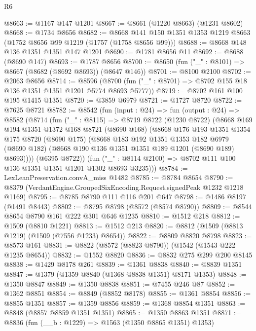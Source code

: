 \begin{lexlean}{R6}
\begin{coremodule}
@8663 := @1167 @147 @1201
@8667 := @8661 (@1220 @8663) (@1231 @8602)
@8668 := @1734 @8656
@8682 := @8668 @141 @150 @1351 @1353 @1219 @8663 (@1752 @8656 @99 @1219 (@1757 (@1758 @8656 @99)))
@8688 := @8668 @148 @136 @1351 @1351 @147 @1201
@8690 := @1781 @8656 @11
@8692 := @8688 (@8690 @147)
@8693 := @1787 @8656
@8700 := @8650 (fun ("_" : @8101) => @8667 (@8682 (@8692 @8693)) (@8647 @146))
@8701 := @8100 @2100
@8702 := @2063 @8656
@8714 := @8596
    (@8700 (fun ("_" : @8701) => @8702 @155 @18 @136 @1351 @1351 @1201 @5774 @8693 @5777))
@8719 := @8702 @161 @100 @195 @1415 @1351
@8720 := @3859 @6979
@8721 := @1727 @8720
@8722 := @7625 @8721
@8782 := @8542
    (fun (input : @24) =>
    fun (output : @24) =>
    @8582
      (@8714
        (fun ("_" : @8115) =>
        @8719
          @8722
          (@1230 @8722)
          (@8668
            @169
            @194
            @1351
            @1372
            @168
            @8721
            (@8690 @168)
            (@8668
              @176
              @193
              @1351
              @1354
              @175
              @8720
              (@8690 @175)
              (@8668
                @183
                @192
                @1351
                @1353
                @182
                @6979
                (@8690 @182)
                (@8668 @190 @136 @1351 @1351 @189 @1201 (@8690 @189) @8693))))
          (@6395 @8722))
        (fun ("_" : @8114 @2100) => @8702 @111 @100 @136 @1351 @1351 @1201 @1302 @8693 @3235)))
@8784 := LexLeanPreservation.convA_miss @1482
@8785 := @8784 @8654
@8790 := @8379 (VerdantEngine.GroupedSixEncoding.Request.signedPeak @1232 @1218 @1169)
@8795 := @8785 @8790 @111 @116 @201 @647
@8798 := @1486 @8197 (@1491 @8443)
@8802 := @8795 @8798 (@8572 (@8574 @8790))
@8809 := @8544 @8654 @8790 @161 @222 @301 @646 @1235
@8810 := @1512 @218
@8812 := @1509 (@8810 @1221)
@8813 := @1512 @213
@8820 := @8812 (@1509 (@8813 @1219) (@1509 (@7556 @1233) @8654))
@8822 := @8809 @8820 @8798
@8823 := @8573 @161
@8831 := @8822 (@8572 (@8823 @8790)) (@1542 (@1543 @222 @1235 @8654))
@8832 := @1552 @8820
@8836 := @8832 @275 @299 @200 @8145
@8838 := @1429 @8178 @261
@8839 := @1361 @8838
@8840 := @8839 @1351
@8847 := @1379 (@1359 @8840 (@1368 @8838 @1351) @8171 @1353)
@8848 := @1350 @8847
@8849 := @1350 @8838
@8851 := @7455 @246 @87
@8852 := @1362 @8851
@8854 := @8849 (@8852 @8178)
@8855 := @1361 @8854
@8856 := @8855 @1351
@8857 := @1359 @8856
@8859 := @1368 @8854 @1351
@8863 := @8848 (@8857 @8859 @1351 @1351)
@8865 := @1350 @8863 @1351
@8871 := @8836 (fun (__b : @1229) => @1563 (@1350 @8865 @1351) @1353)

\end{coremodule}
\end{lexlean}
